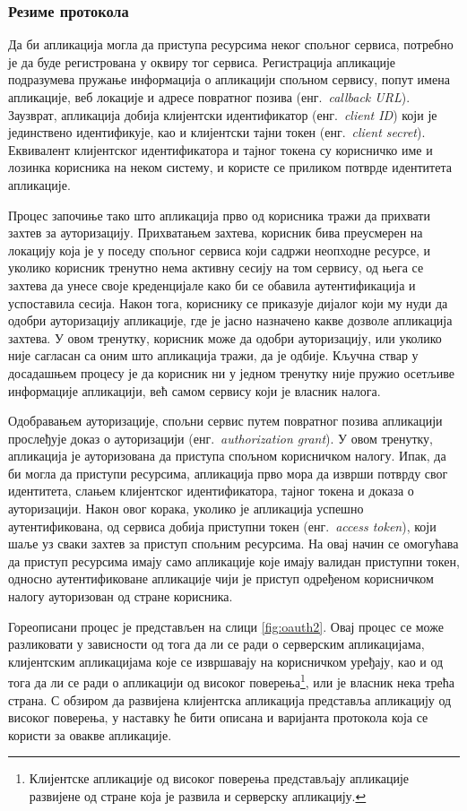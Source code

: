 \documentclass[12pt,oneside]{memoir}
\begin{document}
\subsubsection{Резиме протокола}
Да би апликација могла да приступа ресурсима неког спољног сервиса, потребно је да буде регистрована у оквиру тог сервиса. Регистрација апликације подразумева пружање информација о апликацији спољном сервису, попут имена апликације, веб локације и адресе повратног позива (енг.~\textit{callback URL}). Заузврат, апликација добија клијентски идентификатор (енг.~\textit{client ID}) који је јединствено идентификује, као и клијентски тајни токен (енг.~\textit{client secret}). Еквивалент клијентског идентификатора и тајног токена су корисничко име и лозинка корисника на неком систему, и користе се приликом потврде идентитета апликације.

Процес започиње тако што апликација прво од корисника тражи да прихвати захтев за ауторизацију. Прихватањем захтева, корисник бива преусмерен на локацију која је у поседу спољног сервиса који садржи неопходне ресурсе, и уколико корисник тренутно нема активну сесију на том сервису, од њега се захтева да унесе своје креденцијале како би се обавила аутентификација и успоставила сесија. Након тога, кориснику се приказује дијалог који му нуди да одобри ауторизацију апликације, где је јасно назначено какве дозволе апликација захтева. У овом тренутку, корисник може да одобри ауторизацију, или уколико није сагласан са оним што апликација тражи, да је одбије. Кључна ствар у досадашњем процесу је да корисник ни у једном тренутку није пружио осетљиве информације апликацији, већ самом сервису који је власник налога.

Одобравањем ауторизације, спољни сервис путем повратног позива апликацији прослеђује доказ о ауторизацији (енг.~\textit{authorization grant}). У овом тренутку, апликација је ауторизована да приступа спољном корисничком налогу. Ипак, да би могла да приступи ресурсима, апликација прво мора да изврши потврду свог идентитета, слањем клијентског идентификатора, тајног токена и доказа о ауторизацији. Након овог корака, уколико је апликација успешно аутентификована, од сервиса добија приступни токен (енг.~\textit{access token}), који шаље уз сваки захтев за приступ спољним ресурсима. На овај начин се омогућава да приступ ресурсима имају само апликације које имају валидан приступни токен, односно аутентификоване апликације чији је приступ одређеном корисничком налогу ауторизован од стране корисника.

Гореописани процес је представљен на слици \ref{fig:oauth2}. Овај процес се може разликовати у зависности од тога да ли се ради о серверским апликацијама, клијентским апликацијама које се извршавају на корисничком уређају, као и од тога да ли се ради о апликацији од високог поверења\footnote{Клијентске апликације од високог поверења представљају апликације развијене од стране која је развила и серверску апликацију.}, или је власник нека трећа страна. С обзиром да развијена клијентска апликација представља апликацију од високог поверења, у наставку ће бити описана и варијанта протокола која се користи за овакве апликације.
\end{document}
